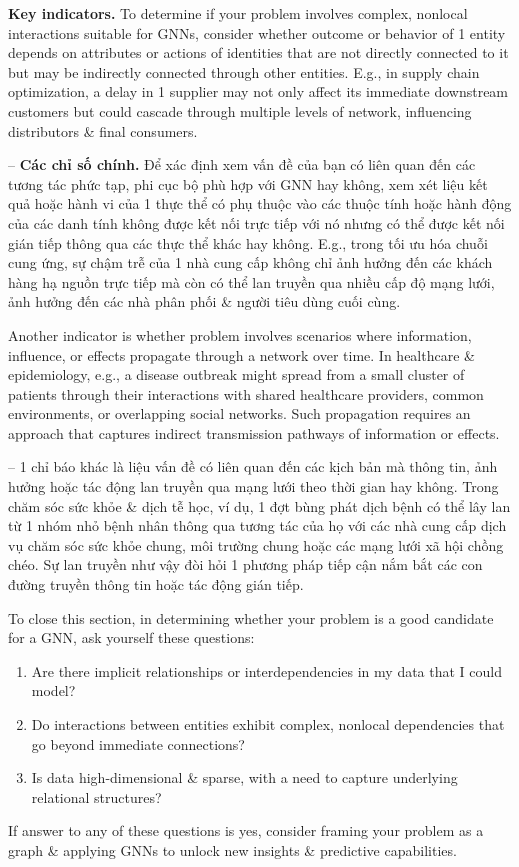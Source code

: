 \documentclass{article}
\begin{document}
\begin{itemize}
\begin{itemize}
\begin{itemize}
            {\bf Key indicators.} To determine if your problem involves complex, nonlocal interactions suitable for GNNs, consider whether outcome or behavior of 1 entity depends on attributes or actions of identities that are not directly connected to it but may be indirectly connected through other entities. E.g., in supply chain optimization, a delay in 1 supplier may not only affect its immediate downstream customers but could cascade through multiple levels of network, influencing distributors \& final consumers.

            -- {\bf Các chỉ số chính.} Để xác định xem vấn đề của bạn có liên quan đến các tương tác phức tạp, phi cục bộ phù hợp với GNN hay không, xem xét liệu kết quả hoặc hành vi của 1 thực thể có phụ thuộc vào các thuộc tính hoặc hành động của các danh tính không được kết nối trực tiếp với nó nhưng có thể được kết nối gián tiếp thông qua các thực thể khác hay không. E.g., trong tối ưu hóa chuỗi cung ứng, sự chậm trễ của 1 nhà cung cấp không chỉ ảnh hưởng đến các khách hàng hạ nguồn trực tiếp mà còn có thể lan truyền qua nhiều cấp độ mạng lưới, ảnh hưởng đến các nhà phân phối \& người tiêu dùng cuối cùng.

            Another indicator is whether problem involves scenarios where information, influence, or effects propagate through a network over time. In healthcare \& epidemiology, e.g., a disease outbreak might spread from a small cluster of patients through their interactions with shared healthcare providers, common environments, or overlapping social networks. Such propagation requires an approach that captures indirect transmission pathways of information or effects.

            -- 1 chỉ báo khác là liệu vấn đề có liên quan đến các kịch bản mà thông tin, ảnh hưởng hoặc tác động lan truyền qua mạng lưới theo thời gian hay không. Trong chăm sóc sức khỏe \& dịch tễ học, ví dụ, 1 đợt bùng phát dịch bệnh có thể lây lan từ 1 nhóm nhỏ bệnh nhân thông qua tương tác của họ với các nhà cung cấp dịch vụ chăm sóc sức khỏe chung, môi trường chung hoặc các mạng lưới xã hội chồng chéo. Sự lan truyền như vậy đòi hỏi 1 phương pháp tiếp cận nắm bắt các con đường truyền thông tin hoặc tác động gián tiếp.

            To close this section, in determining whether your problem is a good candidate for a GNN, ask yourself these questions:
            \begin{enumerate}
                \item Are there implicit relationships or interdependencies in my data that I could model?
                \item Do interactions between entities exhibit complex, nonlocal dependencies that go beyond immediate connections?
                \item Is data high-dimensional \& sparse, with a need to capture underlying relational structures?
            \end{enumerate}
            If answer to any of these questions is yes, consider framing your problem as a graph \& applying GNNs to unlock new insights \& predictive capabilities.


\end{itemize}
\end{itemize}
\end{itemize}
\end{document}
